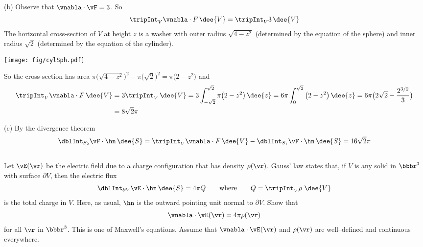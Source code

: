 \begin{solution}
(b) Observe that $\vnabla\cdot \vF=3$. So
\begin{equation*}
\tripInt_V\vnabla\cdot F\,\dee{V}
=\tripInt_V 3\,\dee{V}
\end{equation*}
The horizontal cross-section of $V$ at height $z$ is a washer with outer
radius $\sqrt{4-z^2}$ (determined by the equation of the sphere) and inner
radius $\sqrt{2}$ (determined by the equation of the cylinder).
\begin{center}
       \texttt{[image: fig/cylSph.pdf]}
\end{center}
So the cross-section has area 
$\pi\big(\sqrt{4-z^2}\big)^2-\pi\big(\sqrt{2}\big)^2=\pi\big(2-z^2\big)$
and
\begin{align*}
\tripInt_V\vnabla\cdot F\,\dee{V}
&=3\tripInt_V \,\dee{V}
=3\int_{-\sqrt{2}}^{\sqrt{2}} \pi\big(2-z^2\big)\,\dee{z}
=6\pi \int_{0}^{\sqrt{2}} \big(2-z^2\big)\,\dee{z}
=6\pi\big(2\sqrt{2}-\frac{2^{3/2}}{3}\big) \\
&=8\sqrt{2}\pi
\end{align*}

(c)
By the divergence theorem
$$
\dblInt_{S_2}\vF\cdot \hn\,\dee{S}
=\tripInt_V\vnabla\cdot F\,\dee{V}
-\dblInt_{S_1}\vF\cdot \hn\,\dee{S}
=16\sqrt{2}\pi
$$
\end{solution}


\subsection*{\Application}

\begin{question}
Let $\vE(\vr)$ be the electric field due to a charge
configuration that has density $\rho(\vr)$. Gauss' law states that, if
$V$ is any solid in $\bbbr^3$ with surface $\partial V$, then the electric
flux 
\begin{equation*}
\dblInt_{\partial V}\vE\cdot\hn\, \dee{S}=4\pi Q
\qquad{\rm where}\qquad Q=\tripInt_V\rho\ \dee{V}
\end{equation*}
is the total charge  in $V$. Here, as usual, $\hn$ is the outward pointing
unit normal to $\partial V$. Show that
\begin{equation*}
\vnabla\cdot\vE(\vr)=4\pi \rho(\vr)
\end{equation*}
for all $\vr$ in $\bbbr^3$. This is one of Maxwell's equations.
Assume that $\vnabla\cdot\vE(\vr)$ and $ \rho(\vr)$ are well--defined and continuous
everywhere.
\end{question}

